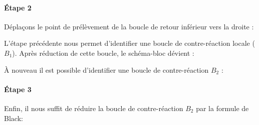 \paragraph{\'Etape 2}
Déplaçons le point de prélèvement de la boucle de retour inférieur vers 
la droite  : 
\begin{center}
    
\end{center}
L'étape précédente nous permet d'identifier une boucle de contre-réaction 
locale ($B_1$). Après réduction de cette boucle, le schéma-bloc dévient : 
\begin{center}
    
\end{center}
\`A nouveau il est possible d'identifier une boucle de contre-réaction $B_2$ :
\begin{center}
    
\end{center}
\paragraph{\'Etape 3}
Enfin, il nous suffit de réduire la boucle de contre-réaction $B_2$ par la 
formule de Black:
\begin{center}
    
\end{center}
